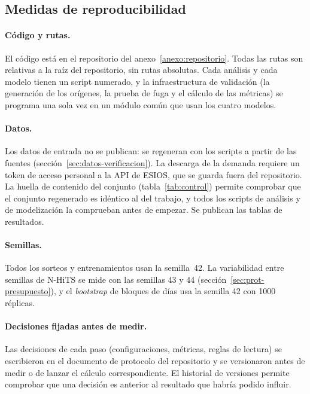 \subsection{Medidas de reproducibilidad}\label{sec:entorno-medidas}

\paragraph{Código y rutas.} El código está en el repositorio del anexo~\ref{anexo:repositorio}.
Todas las rutas son relativas a la raíz del repositorio, sin rutas absolutas.
Cada análisis y cada modelo tienen un script numerado, y la infraestructura de
validación (la generación de los orígenes, la prueba de fuga y el cálculo de las
métricas) se programa una sola vez en un módulo común que usan los cuatro modelos.

\paragraph{Datos.} Los datos de entrada no se publican: se regeneran con los
scripts a partir de las fuentes (sección~\ref{sec:datos-verificacion}). La
descarga de la demanda requiere un token de acceso personal a la API de ESIOS,
que se guarda fuera del repositorio. La huella de contenido del conjunto
(tabla~\ref{tab:control}) permite comprobar que el conjunto regenerado es
idéntico al del trabajo, y todos los scripts de análisis y de modelización la
comprueban antes de empezar. Se publican las tablas de resultados.

\paragraph{Semillas.} Todos los sorteos y entrenamientos usan la semilla~42. La
variabilidad entre semillas de N-HiTS se mide con las semillas 43 y 44
(sección~\ref{sec:prot-presupuesto}), y el \textit{bootstrap} de bloques de días
usa la semilla 42 con 1000 réplicas.

\paragraph{Decisiones fijadas antes de medir.} Las decisiones de cada paso
(configuraciones, métricas, reglas de lectura) se escribieron en el documento
de protocolo del repositorio y se versionaron antes de medir o de lanzar el
cálculo correspondiente. El historial de versiones permite comprobar que una
decisión es anterior al resultado que habría podido influir.

